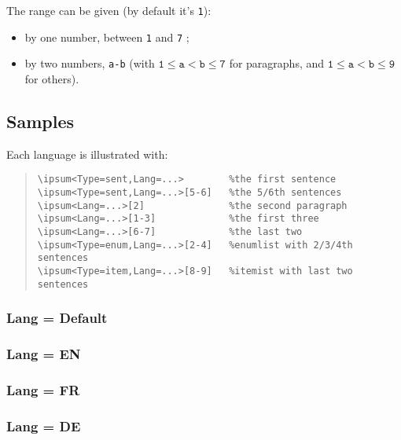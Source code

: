 \documentclass[11pt,a4paper]{ltxdoc}
\begin{document}
The \textsf{range} can be given (by default it's \texttt{1}):

\begin{itemize}
	\item by one number, between \texttt{1} and \texttt{7} ;
	\item by two numbers, \texttt{a-b} (with $\mathtt{1 \leq a < b \leq 7}$ for paragraphs, and $\mathtt{1 \leq a < b \leq 9}$ for others).
\end{itemize}

\subsection{Samples}

Each language is illustrated with:

\begin{quote}
\begin{verbatim}
\ipsum<Type=sent,Lang=...>        %the first sentence
\ipsum<Type=sent,Lang=...>[5-6]   %the 5/6th sentences
\ipsum<Lang=...>[2]               %the second paragraph
\ipsum<Lang=...>[1-3]             %the first three
\ipsum<Lang=...>[6-7]             %the last two
\ipsum<Type=enum,Lang=...>[2-4]   %enumlist with 2/3/4th sentences
\ipsum<Type=item,Lang=...>[8-9]   %itemist with last two sentences
\end{verbatim}
\end{quote}

\pagebreak

\subsubsection{Lang = Default}


\pagebreak

\subsubsection{Lang = EN}


\pagebreak

\subsubsection{Lang = FR}


\pagebreak

\subsubsection{Lang = DE}
\end{document}
